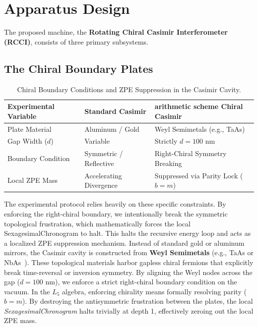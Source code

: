 \section{Apparatus Design}\label{sec:design}

The proposed machine, the \textbf{Rotating Chiral Casimir Interferometer (RCCI)}, consists of three primary subsystems.

\subsection{The Chiral Boundary Plates}\label{sec:plates}

\begin{table}[ht]
\centering
\begin{tabular}{|l|l|l|}
\hline
\textbf{Experimental Variable} & \textbf{Standard Casimir} & \textbf{arithmetic scheme Chiral Casimir} \\
\hline
Plate Material & Aluminum / Gold & Weyl Semimetals (e.g., TaAs) \\
Gap Width ($d$) & Variable & Strictly $d = 100$ nm \\
Boundary Condition & Symmetric / Reflective & Right-Chiral Symmetry Breaking \\
Local ZPE Mass & Accelerating Divergence & Suppressed via Parity Lock ($b=m$) \\
\hline
\end{tabular}
\caption{Chiral Boundary Conditions and ZPE Suppression in the Casimir Cavity.}
\label{tab:chiral_casimir}
\end{table}

The experimental protocol relies heavily on these specific constraints. By enforcing the right-chiral boundary, we intentionally break the symmetric topological frustration, which mathematically forces the local SexagesimalChronogram to halt. This halts the recursive energy loop and acts as a localized ZPE suppression mechanism.
Instead of standard gold or aluminum mirrors, the Casimir cavity is constructed from \textbf{Weyl Semimetals} (e.g., TaAs or NbAs~\cite{Lv2015TaAs}). These topological materials harbor gapless chiral fermions that explicitly break time-reversal or inversion symmetry. By aligning the Weyl nodes across the gap ($d = 100\text{ nm}$), we enforce a strict right-chiral boundary condition on the vacuum. In the $L_5$ algebra, enforcing chirality means formally resolving parity ($b = m$). By destroying the antisymmetric frustration between the plates, the local \emph{SexagesimalChronogram} halts trivially at depth 1, effectively zeroing out the local ZPE mass.


